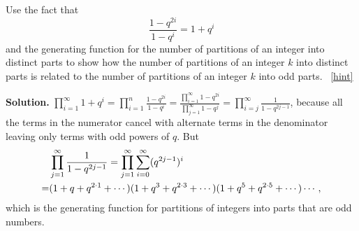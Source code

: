 \documentclass{book}
\begin{document}
\setcounter{project}{324}
\addtocounter{project}{-1}
\begin{activity}[]\label{activity-317}
\hypertarget{p-1671}{}%
Use the fact that%
\begin{equation*}
\frac{1-q^{2i}}{1-q^i}= 1+q^i
\end{equation*}
and the generating function for the number of partitions of an integer into distinct parts to show how the number of partitions of an integer \(k\) into distinct parts is related to the number of partitions of an integer \(k\) into odd parts.%
~\hfill{\tiny\hyperlink{a-324}{[hint]}\hypertarget{q-324}{}}\par\smallskip%
\noindent\textbf{Solution.}\hypertarget{solution-258}{}\quad%
\hypertarget{p-1673}{}%
\(\displaystyle\prod_{i=1}^\infty 1+q^i=\prod_{i=1}^n \frac{1-q^{2i}}{1-q^i}=\frac{\prod_{i=1}^\infty1-q^{2i}}{\prod_{j=1}^\infty 1-q^j} =\prod_{i=j}^\infty \frac{1}{1-q^{2j-1}}\), because all the terms in the numerator cancel with alternate terms in the denominator leaving only terms with odd powers of \(q\). But%
\begin{align*}
& \prod_{j=1}^\infty\frac{1}{1-q^{2j-1}} =  \prod_{j=1}^\infty \sum_{i=0}^\infty (q^{2j-1})^i\\
=& (1+q+q^{2\cdot1}+\cdots)(1+q^3+q^{2\cdot3}+\cdots)(1
+q^5+q^{2\cdot5}+\cdots)\cdots,
\end{align*}
which is the generating function for partitions of integers into parts that are odd numbers.%
\end{activity}
\end{document}

